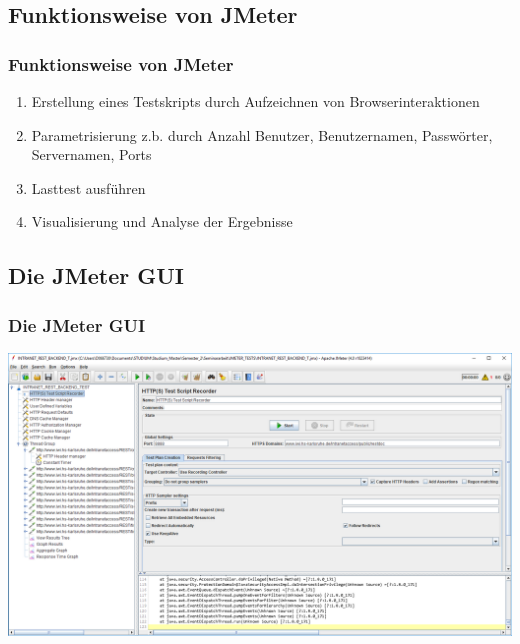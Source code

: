 \documentclass[xcolor=dvipsnames]{beamer}
\begin{document}
\subsection{Funktionsweise von JMeter}
\begin{frame}
\frametitle{Funktionsweise von JMeter}
\begin{enumerate}
\item Erstellung eines Testskripts durch Aufzeichnen von Browserinteraktionen
\item Parametrisierung z.b. durch Anzahl Benutzer, Benutzernamen, Passwörter, Servernamen, Ports
\item Lasttest ausführen 
\item Visualisierung und Analyse der Ergebnisse 
\end{enumerate}
\end{frame}

\subsection{Die JMeter GUI}
\begin{frame}
\frametitle{Die JMeter GUI}
\begin{center}\includegraphics[width=1\textwidth]{bilder/jmeter_gui}
\end{center}
\end{frame}
\end{document}
